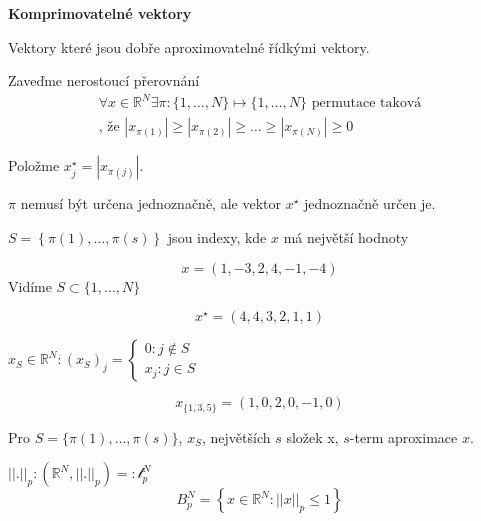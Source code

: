\documentclass[../main.tex]{subfiles}
\begin{document}
\begin{definition}
    \textbf{Komprimovatelné vektory}

    Vektory které jsou dobře aproximovatelné řídkými vektory.

    Zaveďme nerostoucí přerovnání
    \begin{multline}
        \forall x \in \mathbb{R}^N \exists \pi:\{1,\dots,N\} \mapsto \{1, \dots, N\} \text{ permutace taková}\\\text{, že } 
        |x_{\pi(1)}| \geq |x_{\pi(2)}| \geq \dots \geq |x_{\pi(N)}| \geq 0
    \end{multline}

    Položme $x_j^\star = |x_{\pi(j)}|$.

    $\pi$ nemusí být určena jednoznačně, ale vektor $x^\star$ jednoznačně určen je. 

    $S= \left\{ \pi(1), \dots, \pi(s) \right\}$ jsou indexy, kde $x$ má největší hodnoty
\end{definition}


\begin{example}
    \begin{equation}
        x = (1,-3,2,4,-1,-4)
    \end{equation}
    Vidíme $S \subset \{1,\dots,N\}$

    \begin{equation}
        x^\star = (4,4,3,2,1,1)
    \end{equation}

    $x_S\in \mathbb{R}^N: (x_S)_j = \begin{cases}
        0: j\notin S\\
        x_j : j \in S
    \end{cases}$

    \begin{equation}
        x_{\{1,3,5\}} = (1,0,2,0,-1,0)
    \end{equation}

    Pro $S=\{\pi(1),\dots,\pi(s)\}$, $x_S$, největších $s$ složek x, $s$-term aproximace $x$.
\end{example}


\begin{definition}
    $||.||_p : (\mathbb{R}^N, ||.||_p) =: \mathcal{l}_p^N$
    \begin{equation}
        B_p^N = \left\{x \in \mathbb{R}^N : ||x||_p \leq 1 \right\}
    \end{equation}
\end{definition}
\end{document}
